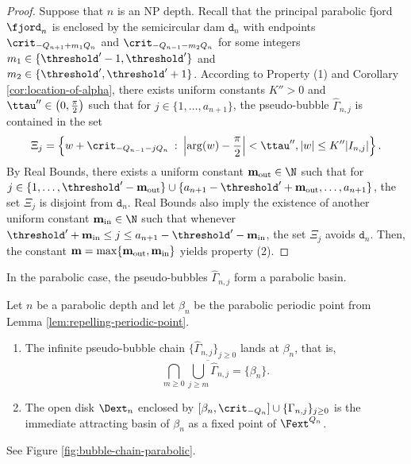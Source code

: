\documentclass{amsart}
\begin{document}
\begin{proof}
    Suppose that $n$ is an NP depth.
    Recall that the principal parabolic fjord $\fjord_n$ is enclosed by the semicircular dam $\mathtt{d}_n$ with endpoints $\crit_{-Q_{n+1}+m_1 Q_n}$ and $\crit_{-Q_{n-1}-m_2 Q_n}$ for some integers $m_1 \in \{ \threshold'-1,\threshold'\}$ and $m_2 \in \{ \threshold', \threshold'+1\}$.
    According to Property (1) and Corollary \ref{cor:location-of-alpha}, there exists uniform constants $K''>0$ and $\ttau'' \in \left( 0,\frac{\pi}{2} \right)$ such that for $j \in \{1,\ldots, a_{n+1}\}$, the pseudo-bubble $\hat{\Gamma}_{n,j}$ is contained in the set
    \[
        \Xi_j = \left\{ w + \crit_{-Q_{n-1}-jQ_n} \: : \: \left| \arg(w) - \frac{\pi}{2} \right| < \ttau'', |w| \leq K'' |I_{n,j}| \right\}.
    \]
    By Real Bounds, there exists a uniform constant $\mathbf{m}_{\textnormal{out}} \in \N$ such that for $j \in \{1,\ldots, \threshold'-\mathbf{m}_{\textnormal{out}}\} \cup \{ a_{n+1}-\threshold'+\mathbf{m}_{\textnormal{out}},\ldots, a_{n+1}\}$, the set $\Xi_j$ is disjoint from $\mathtt{d}_n$.
    Real Bounds also imply the existence of another uniform constant $\mathbf{m}_{\textnormal{in}} \in \N$ such that whenever $\threshold' + \mathbf{m}_{\textnormal{in}} \leq j \leq a_{n+1}-\threshold'-\mathbf{m}_{\textnormal{in}}$, the set $\Xi_j$ avoids $\mathtt{d}_n$.
    Then, the constant $\mathbf{m} = \max\{ \mathbf{m}_{\textnormal{out}}, \mathbf{m}_{\textnormal{in}} \}$ yields property (2).
\end{proof}

In the parabolic case, the pseudo-bubbles $\hat{\Gamma}_{n,j}$ form a parabolic basin.

\begin{lemma}
\label{lem:parabolic-basin}
    Let $n$ be a parabolic depth and let $\beta_n$ be the parabolic periodic point from Lemma \ref{lem:repelling-periodic-point}.
    \begin{enumerate}
        \item The infinite pseudo-bubble chain $\{\hat{\Gamma}_{n,j}\}_{j \geq 0}$ lands at $\beta_n$, that is,
        \[
            \bigcap_{m \geq 0} \overline{ \bigcup_{j \geq m} \hat{\Gamma}_{n,j} } = \{\beta_n \}.
        \]
        \item The open disk $\Dext_n$ enclosed by $[\beta_n, \crit_{-Q_n}] \cup \{\Gamma_{n,j}\}_{j \geq 0}$ is the immediate attracting basin of $\beta_n$ as a fixed point of $\Fext^{Q_n}$. 
    \end{enumerate}
\end{lemma}

See Figure \ref{fig:bubble-chain-parabolic}.
\end{document}
